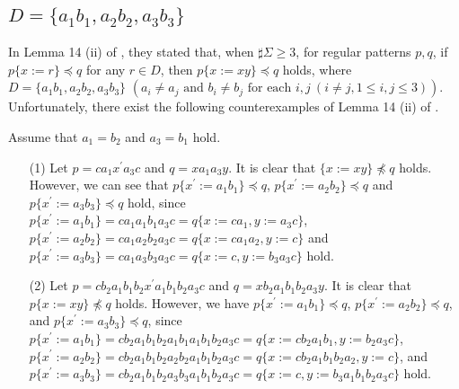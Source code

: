 \subsection{$D = \{ a_{1}b_{1}, a_{2}b_{2}, a_{3}b_{3}\}$}\label{subsec:d3c}

In Lemma 14 (ii) of \cite{Sato1}, 
they stated that, when $\sharp \Sigma \geq 3$, for regular patterns $p,q$, if $p\{x:=r\}\preceq q$ for any $r\in D$, then $p\{x:=xy\} \preceq q$ holds, where 
$D = \{ a_{1}b_{1}, a_{2}b_{2}, a_{3}b_{3}\}$ $(a_{i} \ne a_{j} \mbox{ and } b_{i} \ne b_{j} \mbox{ for each } i,j~(i\ne j, 1\le i,j\le 3))$.
Unfortunately, there exist the following counterexamples of Lemma 14 (ii) of \cite{Sato1}.
\begin{ex}\label{CounterExample_Lemma14}
Assume that $a_1=b_2$ and $a_3=b_1$ hold.
  
\begin{itemize}
\item[(1)] 
Let $p=ca_1x^{\prime}a_3c$ and $q=xa_1a_3y$.
It is clear that $\{x:=xy\} \not\preceq q$ holds.
However, we can see that $p\{x^{\prime}:=a_1b_1\}\preceq q$, $p\{x^{\prime}:=a_2b_2\}\preceq q$ and $p\{x^{\prime}:=a_3b_3\}\preceq q$ hold, 
since
$p\{x^{\prime}:=a_1b_1\}=ca_1a_1b_1a_3c=q\{x:=ca_1,y:=a_3c\}$,
$p\{x^{\prime}:=a_2b_2\}=ca_1a_2b_2a_3c=q\{x:=ca_1a_2,y:=c\}$ and 
$p\{x^{\prime}:=a_3b_3\}=ca_1a_3b_3a_3c=q\{x:=c,y:=b_3a_3c\}$ hold.

\item[(2)] 
Let $p=cb_2a_1b_1b_2x^{\prime}a_1b_1b_2a_3c$ and $q=xb_2a_1b_1b_2a_3y$.
It is clear that $p\{x:=xy\} \not\preceq q$ holds.
However, we have $p\{x^{\prime}:=a_1b_1\}\preceq q$, $p\{x^{\prime}:=a_2b_2\} \preceq q$, and $p\{x^{\prime}:=a_3b_3\} \preceq q$, 
since  
$p\{x^{\prime}:=a_1b_1\}=cb_2a_1b_1b_2a_1b_1a_1b_1b_2a_3c=q\{x:=cb_2a_1b_1,y:=b_2a_3c\}$,
$p\{x^{\prime}:=a_2b_2\}=cb_2a_1b_1b_2a_2b_2a_1b_1b_2a_3c=q\{x:=cb_2a_1b_1b_2a_2,y:=c\}$,
and  $p\{x^{\prime}:=a_3b_3\}=cb_2a_1b_1b_2a_3b_3a_1b_1b_2a_3c=q\{x:=c,y:=b_3a_1b_1b_2a_3c\}$ hold.
\end{itemize}
\end{ex}

